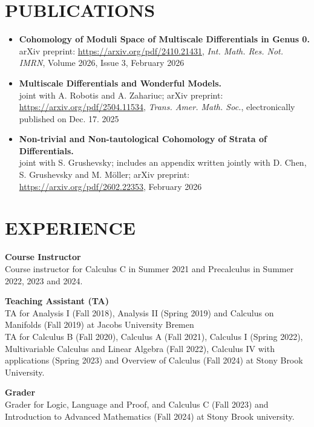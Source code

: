 \documentclass[margin]{res}
\begin{document}
\begin{resume}
\section{PUBLICATIONS}
\begin{itemize}
\item \textbf{Cohomology of Moduli Space of Multiscale Differentials in Genus 0.}\\arXiv preprint: \url{https://arxiv.org/pdf/2410.21431}, {\em Int. Math. Res. Not. IMRN}, Volume 2026, Issue 3, February 2026
\item \textbf{Multiscale Differentials and Wonderful Models.}\\joint with A. Robotis and A. Zahariuc; arXiv preprint: \url{https://arxiv.org/pdf/2504.11534}, {\em Trans. Amer. Math. Soc.}, electronically published on Dec. 17. 2025
\item \textbf{Non-trivial and Non-tautological Cohomology of Strata of Differentials.}\\joint with S. Grushevsky; includes an appendix written jointly with D. Chen, S. Grushevsky and M. M\"oller; arXiv preprint: \url{https://arxiv.org/pdf/2602.22353}, February 2026
  \end{itemize}

\section{EXPERIENCE}
\par
\textbf{Course Instructor}\\
Course instructor for Calculus C in Summer 2021 and Precalculus in Summer 2022, 2023 and 2024.
\par
\textbf{Teaching Assistant (TA)}\\
TA for Analysis I (Fall 2018), Analysis II (Spring 2019) and Calculus on Manifolds (Fall 2019) at Jacobs University Bremen\\
TA  for Calculus B (Fall 2020), Calculus A (Fall 2021), Calculus I (Spring 2022), Multivariable Calculus and Linear Algebra (Fall 2022), Calculus IV with applications (Spring 2023) and Overview of Calculus (Fall 2024) at Stony Brook University.
\par
\textbf{Grader}\\
Grader for Logic, Language and Proof, and Calculus C (Fall 2023) and Introduction to Advanced Mathematics (Fall 2024) at Stony Brook university.



\end{resume}
\end{document}
